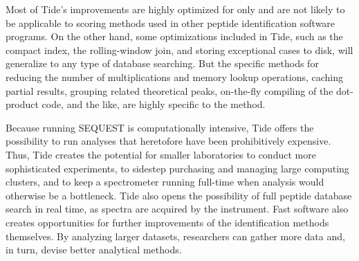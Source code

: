 
Most of Tide's improvements are highly optimized for \XCorr only and
are not likely to be applicable to scoring methods used in other
peptide identification software programs. On the other hand, some
optimizations included in Tide, such as the compact index, the
rolling-window join, and storing exceptional cases to disk, 
will generalize to any type of database searching. But
the specific methods for reducing the number of multiplications and
memory lookup operations, caching partial results, grouping related
theoretical peaks, on-the-fly compiling of the dot-product code, and
the like, are highly specific to the \XCorr method.

Because running SEQUEST is computationally intensive, Tide offers the
possibility to run analyses that heretofore have been prohibitively
expensive. Thus, Tide creates the potential for smaller laboratories
to conduct more sophisticated experiments, to sidestep purchasing and
managing large computing clusters, and to keep a spectrometer running
full-time when analysis would otherwise be a bottleneck. Tide also
opens the possibility of full peptide database search in real time, as
spectra are acquired by the instrument. Fast software also creates
opportunities for further improvements of the identification methods
themselves. By analyzing larger datasets, researchers can gather more
data and, in turn, devise better analytical methods.

